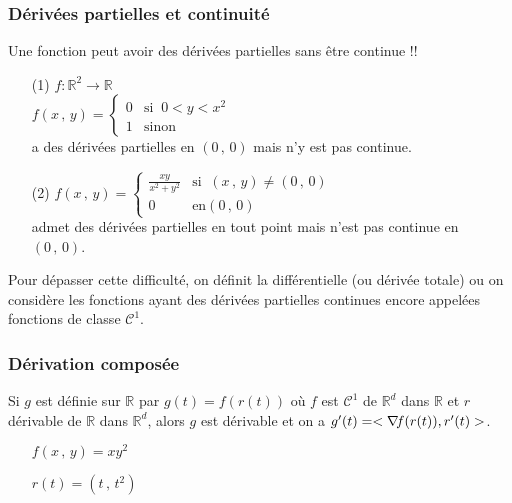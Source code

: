 \documentclass[class=report,crop=false]{standalone}
\begin{document}
{{\subsubsection{Dérivées partielles et continuité}

Une fonction peut avoir des dérivées partielles sans \^etre continue !!


\begin{enumerate}
\item[(1)] $f : \mathbb{R}^2 \rightarrow \mathbb{R}$\\
$f(x\,,\,y) = \left \lbrace
\begin{array}{ll}
0 & \textrm{si}\;\; 0 < y < x^2 \\
1 & \textrm{sinon}
\end{array}
\right.$\\
a des dérivées partielles en $(0\,,\,0)$ mais n'y est pas continue.
\item[(2)] $f(x\,,\,y) = \left \lbrace
\begin{array}{ll}
\frac{xy}{x^2 + y^2} & \textrm{si}\;\; (x\,,\,y) \neq (0\,,\,0) \\
0 & \textrm{en} (0\,,\,0)
\end{array}
\right.$\\
admet des dérivées partielles en tout point mais n'est pas continue en $(0\,,\,0)$.
\end{enumerate}
Pour dépasser cette difficulté, on définit la différentielle (ou dérivée totale) ou on consid\`ere les fonctions ayant des dérivées partielles continues encore appelées fonctions de classe $\mathcal{C}^1$.



\subsubsection{Dérivation composée}


\begin{theoreme}
Si $g$ est définie sur $\mathbb{R}$ par $g(t) = f(r(t))$ o\`u $f$ est $\mathcal{C}^1$ de $\mathbb{R}^d$ dans $\mathbb{R}$ et $r$ dérivable de $\mathbb{R}$ dans $\mathbb{R}^d$, alors $g$ est dérivable et on a $g'(t) =< \nabla\hspace{-0.6mm} f (r(t)) , r'(t)>$.
\end{theoreme}

\begin{enumerate}
\item[ ] $f(x\,,\,y) = xy^2$
\item[ ] $r(t) = (t\,,\,t^2)$
\end{enumerate}






}}
\end{document}
